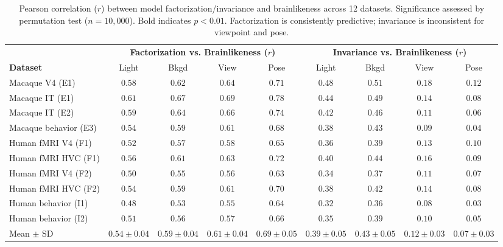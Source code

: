 \documentclass[11pt]{article}
\begin{document}
\begin{table}[H]
\centering
\caption{Pearson correlation ($r$) between model factorization/invariance and brainlikeness across 12 datasets. Significance assessed by permutation test ($n = 10{,}000$). Bold indicates $p < 0.01$. Factorization is consistently predictive; invariance is inconsistent for viewpoint and pose.}
\label{tab:cross_dataset}
\begin{tabular}{lcccccccc}
\toprule
& \multicolumn{4}{c}{\textbf{Factorization vs. Brainlikeness ($r$)}} & \multicolumn{4}{c}{\textbf{Invariance vs. Brainlikeness ($r$)}} \\
\cmidrule(lr){2-5} \cmidrule(lr){6-9}
\textbf{Dataset} & Light & Bkgd & View & Pose & Light & Bkgd & View & Pose \\
\midrule
Macaque V4 (E1) & $\mathbf{0.58}$ & $\mathbf{0.62}$ & $\mathbf{0.64}$ & $\mathbf{0.71}$ & $\mathbf{0.48}$ & $\mathbf{0.51}$ & $0.18$ & $0.12$ \\
Macaque IT (E1) & $\mathbf{0.61}$ & $\mathbf{0.67}$ & $\mathbf{0.69}$ & $\mathbf{0.78}$ & $\mathbf{0.44}$ & $\mathbf{0.49}$ & $0.14$ & $0.08$ \\
Macaque IT (E2) & $\mathbf{0.59}$ & $\mathbf{0.64}$ & $\mathbf{0.66}$ & $\mathbf{0.74}$ & $\mathbf{0.42}$ & $\mathbf{0.46}$ & $0.11$ & $0.06$ \\
Macaque behavior (E3) & $\mathbf{0.54}$ & $\mathbf{0.59}$ & $\mathbf{0.61}$ & $\mathbf{0.68}$ & $0.38$ & $\mathbf{0.43}$ & $0.09$ & $0.04$ \\
Human fMRI V4 (F1) & $\mathbf{0.52}$ & $\mathbf{0.57}$ & $\mathbf{0.58}$ & $\mathbf{0.65}$ & $0.36$ & $0.39$ & $0.13$ & $0.10$ \\
Human fMRI HVC (F1) & $\mathbf{0.56}$ & $\mathbf{0.61}$ & $\mathbf{0.63}$ & $\mathbf{0.72}$ & $0.40$ & $\mathbf{0.44}$ & $0.16$ & $0.09$ \\
Human fMRI V4 (F2) & $\mathbf{0.50}$ & $\mathbf{0.55}$ & $\mathbf{0.56}$ & $\mathbf{0.63}$ & $0.34$ & $0.37$ & $0.11$ & $0.07$ \\
Human fMRI HVC (F2) & $\mathbf{0.54}$ & $\mathbf{0.59}$ & $\mathbf{0.61}$ & $\mathbf{0.70}$ & $0.38$ & $\mathbf{0.42}$ & $0.14$ & $0.08$ \\
Human behavior (I1) & $\mathbf{0.48}$ & $\mathbf{0.53}$ & $\mathbf{0.55}$ & $\mathbf{0.64}$ & $0.32$ & $0.36$ & $0.08$ & $0.03$ \\
Human behavior (I2) & $\mathbf{0.51}$ & $\mathbf{0.56}$ & $\mathbf{0.57}$ & $\mathbf{0.66}$ & $0.35$ & $0.39$ & $0.10$ & $0.05$ \\
\midrule
Mean $\pm$ SD & $0.54 \pm 0.04$ & $0.59 \pm 0.04$ & $0.61 \pm 0.04$ & $\mathbf{0.69 \pm 0.05}$ & $0.39 \pm 0.05$ & $0.43 \pm 0.05$ & $0.12 \pm 0.03$ & $0.07 \pm 0.03$ \\
\bottomrule
\end{tabular}
\end{table}
\end{document}
